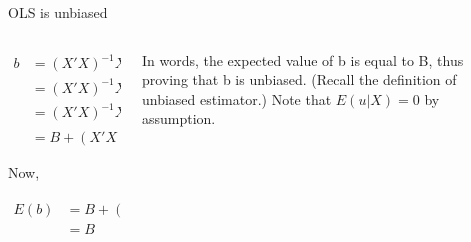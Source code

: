 \documentclass[australian,ignorenonframetext,aspectratio=169]{beamer}
\begin{document}
\begin{frame}{OLS is unbiased}
\protect\hypertarget{ols-is-unbiased-1}{}

\begin{columns}[T]
\begin{column}{0.5\textwidth}
\[
\begin{aligned}
b &=(X'X)^{-1} X'y \\
&=(X'X)^{-1} X'[X B+u], \text { substituting for } y \\
&=(X'X)^{-1} X'X B+(X'X)^{-1} X'u \\
&=B+(X'X)^{-1} X'u
\end{aligned}
\]

Now,

\[
\begin{aligned}
E(b)&=B+(X'X)^{-1} X^{\prime} E(u) \\
&=B
\end{aligned}
\]
\end{column}

\begin{column}{0.5\textwidth}
In words, the expected value of b is equal to B, thus proving that b is
unbiased. (Recall the definition of unbiased estimator.) Note that
\(E(u|X) = 0\) by assumption.
\end{column}
\end{columns}

\end{frame}
\end{document}
